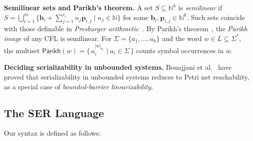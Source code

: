 \medskip
\noindent
\textbf{Semilinear sets and Parikh’s theorem.}
A set $S\subseteq\mathbb N^k$ is \textit{semilinear} if 
$S=\bigcup_{i=1}^m \{\mathbf b_i+\sum_{j=1}^{r_i} n_j\mathbf p_{i,j}\mid n_j\in\mathbb N\}$ 
for some $\mathbf b_i,\mathbf p_{i,j}\in\mathbb N^k$. 
Such sets coincide with those definable in \textit{Presburger arithmetic}~\cite{Pr29}. 
By Parikh’s theorem~\cite{Parikh66}, the \textit{Parikh image} of any CFL is semilinear. 
For $\Sigma=\{a_1,\dots,a_k\}$ and the word $w\in L\subseteq\Sigma^*$,  the multiset
$\mathsf{Parikh}(w)=\{\,a_i^{|w|_{a_i}}\mid a_i\in\Sigma\,\}$ counts symbol occurrences in $w$.



\medskip
\noindent
\textbf{Deciding serializability in unbounded systems.} 
Bouajjani et al.~\cite{BoEmEnHa13} have proved that serializability in unbounded systems reduces to Petri net reachability, as a special case of \textit{bounded-barrier linearizability}.


\subsection{The SER Language}
Our \toolname{} syntax is defined as follows: 

